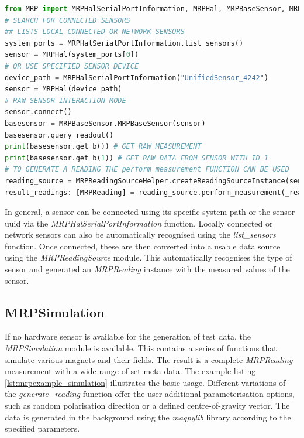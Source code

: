 \newpage

\begin{lstlisting}[language=Python, caption={MRPHal example to use a connected hardware sensor to store raw sensor readings inside a measurement}, label=lst:mrpexample_hal]
from MRP import MRPHalSerialPortInformation, MRPHal, MRPBaseSensor, MRPReadingSource
# SEARCH FOR CONNECTED SENSORS
## LISTS LOCAL CONNECTED OR NETWORK SENSORS
system_ports = MRPHalSerialPortInformation.list_sensors()
sensor = MRPHal(system_ports[0])
# OR USE SPECIFIED SENSOR DEVICE
device_path = MRPHalSerialPortInformation("UnifiedSensor_4242")
sensor = MRPHal(device_path)
# RAW SENSOR INTERACTION MODE
sensor.connect()
basesensor = MRPBaseSensor.MRPBaseSensor(sensor)
basesensor.query_readout()
print(basesensor.get_b()) # GET RAW MEASUREMENT
print(basesensor.get_b(1)) # GET RAW DATA FROM SENSOR WITH ID 1
# TO GENERATE A READING THE perform_measurement FUNCTION CAN BE USED
reading_source = MRPReadingSourceHelper.createReadingSourceInstance(sensor)
result_readings: [MRPReading] = reading_source.perform_measurement(_readings=1, _hwavg=1)
\end{lstlisting}

In general, a sensor can be connected using its specific system path or
the sensor \gls{uuid} via the \emph{MRPHalSerialPortInformation}
function. Locally connected or network sensors can also be automatically
recognised using the \emph{list\_sensors} function. Once connected,
these are then converted into a usable data source using the
\emph{MRPReadingSource} module. This automatically recognises the type
of sensor and generated an \emph{MRPReading} instance with the measured
values of the sensor.

\hypertarget{mrpsimulation}{%
\subsection{MRPSimulation}\label{mrpsimulation}}

If no hardware sensor is available for the generation of test data, the
\emph{MRPSimulation} module is available. This contains a series of
functions that simulate various magnets and their fields. The result is
a complete \emph{MRPReading} measurement with a wide range of set meta
data. The example listing \ref{lst:mrpexample_simulation} illustrates
the basic usage. Different variations of the \emph{generate\_reading}
function offer the user additional parameterisation options, such as
random polarisation direction or a defined centre-of-gravity vector. The
data is generated in the background using the \emph{magpylib}
 library according to the specified parameters.

